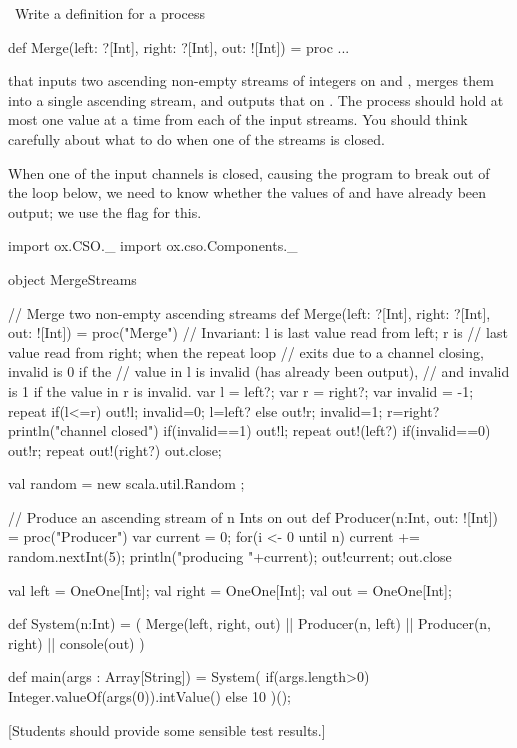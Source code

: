 \begin{question}
\Programming\
Write a definition for a process
%
\begin{scala}
def Merge(left: ?[Int], right: ?[Int], out: ![Int]) 
= proc ...
\end{scala}
%
that inputs two ascending non-empty streams of integers on  and
\SCALA{right}, merges them into a single ascending stream, and outputs that on
\SCALA{out}.  The process should hold at most one value at a time from each of
the input streams.  You should think carefully about what to do when one of
the streams is closed. 
\end{question}
%
\begin{answer}
When one of the input channels is closed, causing the program to break out of
the \SCALA{repeat} loop below, we need to know whether the values of \SCALA{l}
and \SCALA{r} have already been output; we use the flag \SCALA{invalid} for
this.
%
\begin{scala}
import ox.CSO._
import ox.cso.Components._

object MergeStreams{
  // Merge two non-empty ascending streams
  def Merge(left: ?[Int], right: ?[Int], out: ![Int]) 
  = proc("Merge"){
    // Invariant: l is last value read from left; r is 
    // last value read from right; when the repeat loop 
    // exits due to a channel closing, invalid is 0 if the
    // value in l is invalid (has already been output), 
    // and invalid is 1 if the value in r is invalid.
    var l = left?; var r = right?; var invalid = -1;
    repeat{
      if(l<=r){ out!l; invalid=0; l=left? }
      else{ out!r; invalid=1; r=right? }
    }
    println("channel closed")
    if(invalid==1){ out!l; repeat{ out!(left?) } }
    if(invalid==0){ out!r; repeat{ out!(right?) } }
    out.close;
  }

  val random = new scala.util.Random ;

  // Produce an ascending stream of n Ints on out
  def Producer(n:Int, out: ![Int]) = proc("Producer"){
    var current = 0;
    for(i <- 0 until n){ 
      current += random.nextInt(5); 
      println("producing "+current); 
      out!current;
    }
    out.close
  }

  val left = OneOne[Int]; 
  val right = OneOne[Int];
  val out = OneOne[Int];

  def System(n:Int) = (
    Merge(left, right, out) || Producer(n, left) 
    || Producer(n, right) || console(out) 
  )

  def main(args : Array[String]) = 
    System( 
      if(args.length>0)
        Integer.valueOf(args(0)).intValue()
      else 10 
    )();
}
\end{scala}
%
[Students should provide some sensible test results.]
\end{answer}
